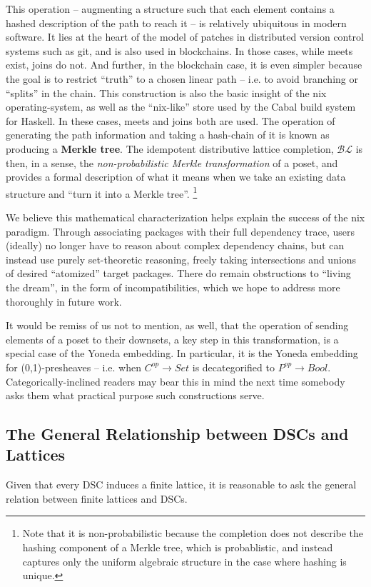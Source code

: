 \documentclass[hoptionsi,review,screen,format=sigconf]{acmart}
\theoremstyle{definition}
\newcommand{\BLc}{\mathcal{BL}}
\begin{document}
This operation -- augmenting a structure such that each element contains a hashed description of the path to reach it -- is relatively ubiquitous in modern software. It lies at the heart of the model of patches in distributed version control systems such as git, and is also used in blockchains. In those cases, while meets exist, joins do not. And further, in the blockchain case, it is even simpler because the goal is to restrict ``truth'' to a chosen linear path -- i.e. to avoid branching or ``splits'' in the chain. This construction is also the basic insight of the nix operating-system, as well as the ``nix-like'' store used by the Cabal build system for Haskell. In these cases, meets and joins both are used. The operation of generating the path information and taking a hash-chain of it is known as producing a \textbf{Merkle tree}\cite{merkle1987digital}. The idempotent distributive lattice completion, \(\BLc\) is then, in a sense,  the \textit{non-probabilistic Merkle transformation} of a poset, and provides a formal description of what it means when we take an existing data structure and ``turn it into a Merkle tree''. \footnote{Note that it is non-probabilistic because the completion does not describe the hashing component of a Merkle tree, which is probablistic, and instead captures only the uniform algebraic structure in the case where hashing is unique.} 

We believe this mathematical characterization helps explain the success of the nix paradigm. Through associating packages with their full dependency trace, users (ideally) no longer have to reason about complex dependency chains, but can instead use purely set-theoretic reasoning, freely taking intersections and unions of desired ``atomized'' target packages. There do remain obstructions to ``living the dream'', in the form of incompatibilities, which we hope to address more thoroughly in future work.

It would be remiss of us not to mention, as well, that the operation of sending elements of a poset to their downsets, a key step in this transformation, is a special case of the Yoneda embedding. In particular, it is the Yoneda embedding for (0,1)-presheaves -- i.e. when \(C^{op} \to Set\) is decategorified to \(P^{op} \to Bool\). Categorically-inclined readers may bear this in mind the next time somebody asks them what practical purpose such constructions serve.

\subsection{The General Relationship between DSCs and Lattices}
Given that every DSC induces a finite lattice, it is reasonable to ask the general relation between finite lattices and DSCs. 
\end{document}
